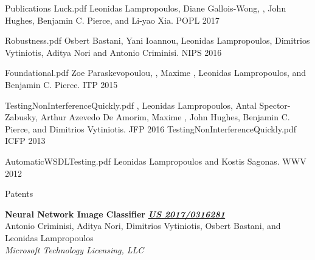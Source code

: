 \documentclass{resume} %
\begin{document}
\begin{rSection}{Publications}
    {Luck.pdf}
    {Leonidas Lampropoulos, Diane Gallois-Wong, \Catalin \Hritcu, John Hughes, Benjamin C. Pierce, and Li-yao Xia.}
    {POPL 2017}

    {Robustness.pdf}
    {Osbert Bastani, Yani Ioannou, Leonidas Lampropoulos, Dimitrios Vytiniotis, Aditya Nori and Antonio Criminisi.}
    {NIPS 2016}

    {Foundational.pdf}
    {Zoe Paraskevopoulou, \Catalin \Hritcu, Maxime \Denes, Leonidas Lampropoulos, and Benjamin C. Pierce.}
    {ITP 2015}
    
    {TestingNonInterferenceQuickly.pdf}
    {\Catalin \Hritcu, Leonidas Lampropoulos, Antal Spector-Zabusky, Arthur
    Azevedo De Amorim, Maxime \Denes, John Hughes, Benjamin C. Pierce, and Dimitrios
    Vytiniotis.}
    {JFP 2016}
    {TestingNonInterferenceQuickly.pdf}
    {ICFP 2013}

    {AutomaticWSDLTesting.pdf}
    {Leonidas Lampropoulos and Kostis Sagonas.}
    {WWV 2012}
   
\end{rSection}



\begin{rSection}{Patents}

{\bf Neural Network Image Classifier} \hfill {\href{https://patentimages.storage.googleapis.com/44/ec/9f/3f90c94a602fda/US20170316281A1.pdf}{\bf \em US 2017/0316281}}\\
Antonio Criminisi, Aditya Nori, Dimitrios Vytiniotis, Osbert Bastani, and Leonidas Lampropoulos\\
{\em Microsoft Technology Licensing, LLC}

  
\end{rSection}


\newcommand{\teach}[3]{
  {#1: #2} \hfill #3 \\
  }
\end{document}
